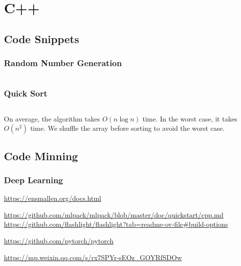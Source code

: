 \chapter{C++}\label{chp:c++}
\minitoc

\section{Code Snippets}

\subsection{Random Number Generation}

\inputminted{cpp}{code/cpp/random_number_generation.cpp}

\subsection{Quick Sort}

\inputminted{cpp}{code/cpp/quick_sort.cpp}

On average, the algorithm takes $O\left(n\log n\right)$ time. In the worst case, it takes $O\left(n^2\right)$ time.
We shuffle the array before sorting to avoid the worst case.

\section{Code Minning}

\subsection{Deep Learning}

\url{https://ensmallen.org/docs.html}

\url{https://github.com/mlpack/mlpack/blob/master/doc/quickstart/cpp.md}
\url{https://github.com/flashlight/flashlight?tab=readme-ov-file#build-options}

\url{https://github.com/pytorch/pytorch}

\url{https://mp.weixin.qq.com/s/rx7SPYr-sEOz_GOYRfSDOw}
